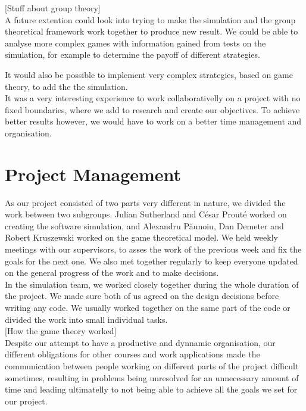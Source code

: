 \documentclass[10pt, a4paper]{report}
\begin{document}
[Stuff about group theory] \\

A future extention could look into trying to make the simulation and the group theoretical framework work together to produce new result. We could be able to analyse more complex games with information gained from tests on the simulation, for example to determine the payoff of different strategies.

It would also be possible to implement very complex strategies, based on game theory, to add the the simulation. \\

It was a very interesting experience to work collaborativelly on a project with no fixed boundaries, where we add to research and create our objectives. To achieve better results however, we would have to work on a better time management and organisation.


\chapter{Project Management}\label{ch:projmanag}

As our project consisted of two parts very different in nature, we divided the work between two subgroups. Julian Sutherland and C\'{e}sar Prout\'{e} worked on creating the software simulation, and Alexandru P\u{a}unoiu, Dan Demeter and Robert Kruszewski worked on the game theoretical model. We held weekly meetings with our supervisors, to asses the work of the previous week and fix the goals for the next one. We also met together regularly to keep everyone updated on the general progress of the work and to make decisions. \\

In the simulation team, we worked closely together during the whole duration of the project. We made sure both of us agreed on the design decisions before writing any code. We usually worked together on the same part of the code or divided the work into small individual tasks. \\

[How the game theory worked] \\

Despite our attempt to have a productive and dynnamic organisation, our different obligations for other courses and work applications made the communication between people working on different parts of the project difficult sometimes, resulting in problems being unresolved for an unnecessary amount of time and leading ultimatelly to not being able to achieve all the goals we set for our project. \\




\end{document}
